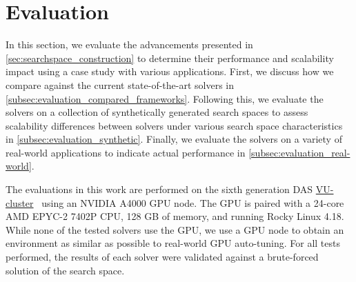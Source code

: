 \section{Evaluation}\label{sec:evaluation}

In this section, we evaluate the advancements presented in \cref{sec:searchspace_construction} to determine their performance and scalability impact using a case study with various applications. 
First, we discuss how we compare against the current state-of-the-art solvers in \cref{subsec:evaluation_compared_frameworks}.
Following this, we evaluate the solvers on a collection of synthetically generated search spaces to assess scalability differences between solvers under various search space characteristics in \cref{subsec:evaluation_synthetic}. 
Finally, we evaluate the solvers on a variety of real-world applications to indicate actual performance in \cref{subsec:evaluation_real-world}. 


The evaluations in this work are performed on the sixth generation DAS \href{https://www.cs.vu.nl/das/clusters.shtml}{VU-cluster}~\cite{DASMediumScaleDistributedSystem} using an NVIDIA A4000 GPU node. The GPU is paired with a 24-core AMD EPYC-2 7402P CPU, 128 GB of memory, and running Rocky Linux 4.18. While none of the tested solvers use the GPU, we use a GPU node to obtain an environment as similar as possible to real-world GPU auto-tuning. 
For all tests performed, the results of each solver were validated against a brute-forced solution of the search space. 


